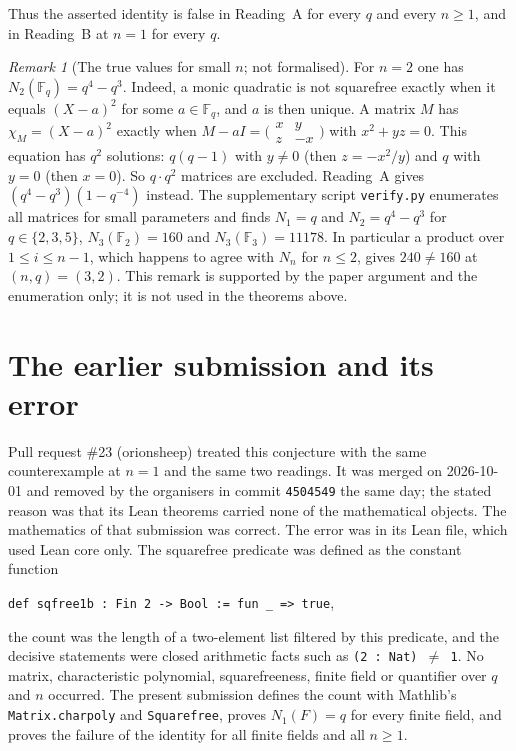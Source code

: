\documentclass[11pt]{article}
\theoremstyle{remark}
\newtheorem{remark}{Remark}
\newcommand{\F}{\mathbb F}
\begin{document}
Thus the asserted identity is false in Reading~A for every $q$ and
every $n\ge1$, and in Reading~B at $n=1$ for every $q$.

\begin{remark}[The true values for small $n$; not formalised]
For $n=2$ one has $N_2(\F_q)=q^4-q^3$. Indeed, a monic quadratic is not
squarefree exactly when it equals $(X-a)^2$ for some $a\in\F_q$, and
$a$ is then unique. A matrix $M$ has $\chi_M=(X-a)^2$ exactly when
$M-aI=\bigl(\begin{smallmatrix}x&y\\z&-x\end{smallmatrix}\bigr)$ with
$x^2+yz=0$. This equation has $q^2$ solutions: $q(q-1)$ with $y\ne0$
(then $z=-x^2/y$) and $q$ with $y=0$ (then $x=0$). So $q\cdot q^2$
matrices are excluded. Reading~A gives $(q^4-q^3)(1-q^{-4})$ instead.
The supplementary script \texttt{verify.py} enumerates all
matrices for small parameters and finds $N_1=q$ and $N_2=q^4-q^3$ for
$q\in\{2,3,5\}$, $N_3(\F_2)=160$ and $N_3(\F_3)=11178$. In particular a
product over $1\le i\le n-1$, which happens to agree with $N_n$ for
$n\le2$, gives $240\ne160$ at $(n,q)=(3,2)$. This remark is supported by
the paper argument and the enumeration only; it is not used in the
theorems above.
\end{remark}

\section*{The earlier submission and its error}
Pull request \#23 (orionsheep) treated this conjecture with the same
counterexample at $n=1$ and the same two readings. It was merged on
2026-10-01 and removed by the organisers in commit \texttt{4504549}
the same day; the stated reason was that its Lean theorems carried none
of the mathematical objects. The mathematics of that submission was
correct. The error was in its Lean file, which used Lean core only. The
squarefree predicate was defined as the constant function
\begin{center}\small\texttt{def sqfree1b : Fin 2 -> Bool := fun \_ => true},\end{center}
the count was the length of a two-element list filtered by this
predicate, and the decisive statements were closed arithmetic facts
such as \texttt{(2 : Nat) $\neq$ 1}. No matrix, characteristic
polynomial, squarefreeness, finite field or quantifier over $q$ and $n$
occurred. The present submission defines the count with Mathlib's
\texttt{Matrix.charpoly} and \texttt{Squarefree}, proves $N_1(F)=q$ for
every finite field, and proves the failure of the identity for all
finite fields and all $n\ge1$.
\end{document}
